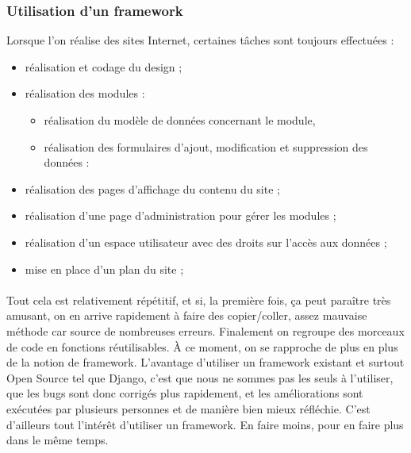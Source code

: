 	  \subsubsection{Utilisation d'un framework}
	  Lorsque l'on réalise des sites Internet, certaines t\^aches sont toujours effectu\'ees :
	  \begin{itemize}
	    \item réalisation et codage du design ;
	    \item réalisation des modules :
	    \begin{itemize}
	      \item réalisation du modèle de données concernant le module,
	      \item réalisation des formulaires d'ajout, modification et suppression des données :
	    \end{itemize}
	    \item réalisation des pages d'affichage du contenu du site ;
	    \item réalisation d'une page d'administration pour gérer les modules ;
	    \item réalisation d'un espace utilisateur avec des droits sur l'accès aux données ;
	    \item mise en place d'un plan du site ;
	  \end{itemize}
	  \paragraph{}
	  Tout cela est relativement répétitif, et si, la première fois, ça peut paraître très amusant, on en arrive rapidement à faire des copier/coller, assez mauvaise méthode car source de nombreuses erreurs. Finalement on regroupe des morceaux de code en fonctions réutilisables. À ce moment, on se rapproche de plus en plus de la notion de framework. L'avantage d'utiliser un framework existant et surtout Open Source tel que Django, c'est que nous ne sommes pas les seuls à l'utiliser, que les bugs sont donc corrigés plus rapidement, et les améliorations sont exécutées par plusieurs personnes et de manière bien mieux réfléchie. C'est d'ailleurs tout l'intérêt d'utiliser un framework. En faire moins, pour en faire plus dans le même temps.


